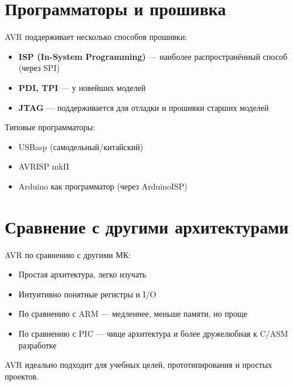 \documentclass[a4paper,12pt]{article}
\begin{document}
\section{Программаторы и прошивка}
AVR поддерживает несколько способов прошивки:
\begin{itemize}
    \item \textbf{ISP (In-System Programming)} — наиболее распространённый способ (через SPI)
    \item \textbf{PDI, TPI} — у новейших моделей
    \item \textbf{JTAG} — поддерживается для отладки и прошивки старших моделей
\end{itemize}
Типовые программаторы:
\begin{itemize}
    \item USBasp (самодельный/китайский)
    \item AVRISP mkII
    \item Arduino как программатор (через ArduinoISP)
\end{itemize}

\section{Сравнение с другими архитектурами}
AVR по сравнению с другими МК:
\begin{itemize}
    \item Простая архитектура, легко изучать
    \item Интуитивно понятные регистры и I/O
    \item По сравнению с ARM — медленнее, меньше памяти, но проще
    \item По сравнению с PIC — чище архитектура и более дружелюбная к C/ASM разработке
\end{itemize}
AVR идеально подходит для учебных целей, прототипирования и простых проектов.
\end{document}
